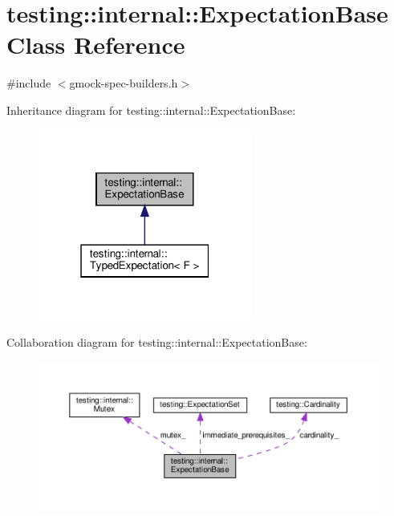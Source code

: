 \hypertarget{classtesting_1_1internal_1_1_expectation_base}{}\section{testing\+:\+:internal\+:\+:Expectation\+Base Class Reference}
\label{classtesting_1_1internal_1_1_expectation_base}


{\ttfamily \#include $<$gmock-\/spec-\/builders.\+h$>$}



Inheritance diagram for testing\+:\+:internal\+:\+:Expectation\+Base\+:
\nopagebreak
\begin{figure}[H]
\begin{center}
\leavevmode
\includegraphics[width=199pt]{classtesting_1_1internal_1_1_expectation_base__inherit__graph}
\end{center}
\end{figure}


Collaboration diagram for testing\+:\+:internal\+:\+:Expectation\+Base\+:
\nopagebreak
\begin{figure}[H]
\begin{center}
\leavevmode
\includegraphics[width=350pt]{classtesting_1_1internal_1_1_expectation_base__coll__graph}
\end{center}
\end{figure}
